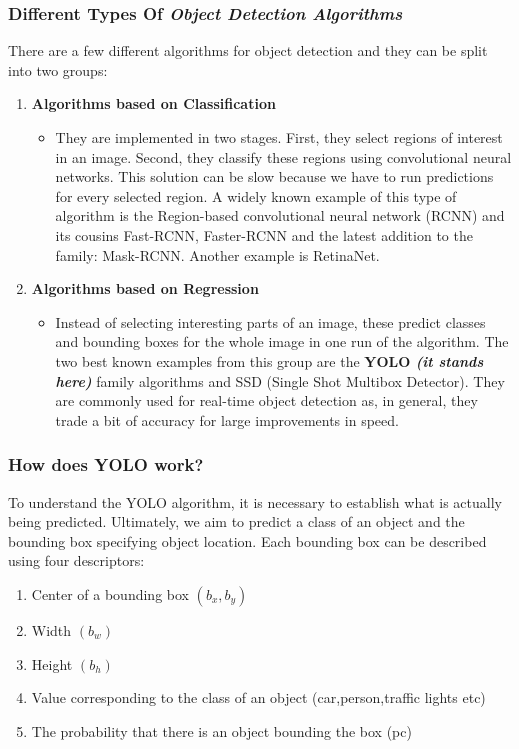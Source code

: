 \documentclass[a4paper]{article}
\begin{document}
\subsubsection{Different Types Of \textit{Object Detection Algorithms}}
There are a few different algorithms for object detection and they can be split into two groups:
\begin{enumerate}
    \item \textbf{Algorithms based on Classification}
          \begin{itemize}[label={}]
              \item They are implemented in two stages. First, they select regions of interest in an image. Second, they classify these regions using convolutional neural networks. This solution can be slow because we have to run predictions for every selected region. A widely known example of this type of algorithm is the Region-based convolutional neural network (RCNN) and its cousins Fast-RCNN, Faster-RCNN and the latest addition to the family: Mask-RCNN. Another example is RetinaNet.
          \end{itemize}

    \item \textbf{Algorithms based on Regression}
          \begin{itemize}[label={}]
              \item Instead of selecting interesting parts of an image, these predict classes and bounding boxes for the whole image in one run of the algorithm. The two best known examples from this group are the \textbf{YOLO \textit{(it stands here)}} family algorithms and SSD (Single Shot Multibox Detector). They are commonly used for real-time object detection as, in general, they trade a bit of accuracy for large improvements in speed.
          \end{itemize}
\end{enumerate}

\subsubsection{How does YOLO work?\cite{appsilon_2020}}
To understand the YOLO algorithm, it is necessary to establish what is actually being predicted. Ultimately, we aim to predict a class of an object and the bounding box specifying object location. Each bounding box can be described using four descriptors:

\begin{enumerate}
    \item Center of a bounding box $(b_x,b_y)$
    \item Width $(b_w)$
    \item Height $(b_h)$
    \item Value corresponding to the class of an object (car,person,traffic lights etc)
    \item The probability that there is an object bounding the box (pc)
\end{enumerate}
\end{document}
